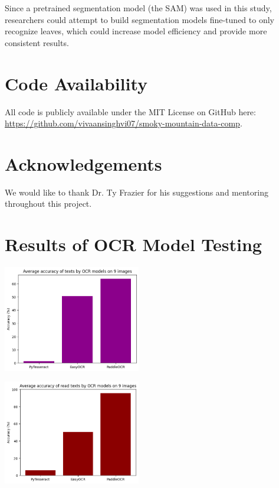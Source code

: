 \documentclass[final,5p,times,twocolumn,authoryear]{elsarticle}
\begin{document}
Since a pretrained segmentation model (the SAM) was used in this study, researchers could attempt to build segmentation models fine-tuned to only recognize leaves, which could increase model efficiency and provide more consistent results.

\section{Code Availability}
\label{code}

All code is publicly available under the MIT License on GitHub here: \url{https://github.com/vivaansinghvi07/smoky-mountain-data-comp}.

\section*{Acknowledgements}
\label{acknowledgements}

We would like to thank Dr. Ty Frazier for his suggestions and mentoring throughout this project.





\newpage
\appendix

\section{Results of OCR Model Testing}
\label{app_ocr_testing}

\begin{center}
	\includegraphics[width=0.45\textwidth]{images/ocr_average_accuracy.png}	
\end{center}

\begin{center}
	\includegraphics[width=0.45\textwidth]{images/pruned_ocr_average_accuracy.png}	
\end{center}
\end{document}

